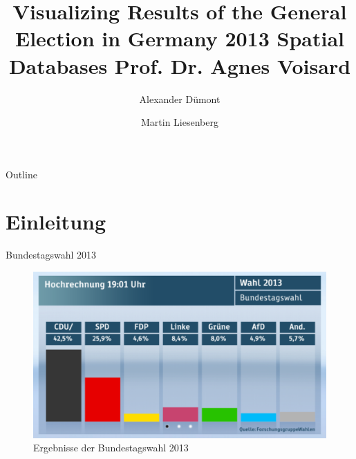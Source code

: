 \documentclass[ucs,9pt]{beamer}
\title[Spatial Databases -- Projekt]{Visualizing Results of the General Election in Germany 2013  Spatial Databases  Prof. Dr. Agnes Voisard}
\author{Alexander D\"umont \and Martin Liesenberg}
\institute[FU Berlin]{Freie Universität Berlin}
\begin{document}
\begin{frame}[plain]
  \titlepage
\end{frame}

\begin{frame}{Outline}
  \tableofcontents
\end{frame}

\section{Einleitung}
\begin{frame}{Bundestagswahl 2013}
	\begin{figure}[hbtp]
		\centering
		\includegraphics[scale=0.45]{ergebniswahl.png}
		\caption{Ergebnisse der Bundestagswahl 2013}
	\end{figure}
\end{frame}
\end{document}
